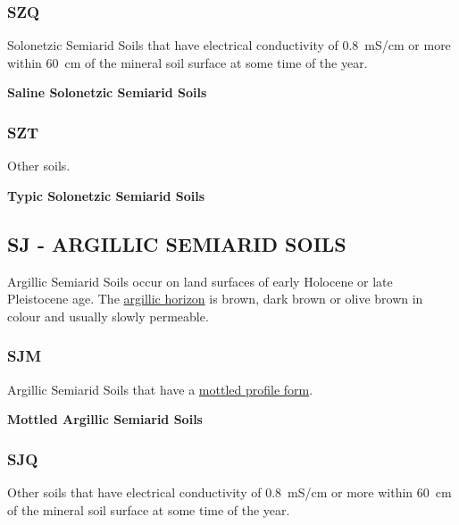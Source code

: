 \documentclass[
  letterpaper,
  DIV=11,
  numbers=noendperiod]{scrreprt}
\begin{document}
\hypertarget{sec-key-SZQ}{%
\subsubsection{\texorpdfstring{\textbf{SZQ}}{SZQ}}\label{sec-key-SZQ}}

Solonetzic Semiarid Soils that have electrical conductivity of 0.8~mS/cm
or more within 60~cm of the mineral soil surface at some time of the
year.

\textbf{Saline Solonetzic Semiarid Soils}

\hypertarget{sec-key-SZT}{%
\subsubsection{\texorpdfstring{\textbf{SZT}}{SZT}}\label{sec-key-SZT}}

Other soils.

\textbf{Typic Solonetzic Semiarid Soils}

\hypertarget{sec-SJ}{%
\subsection{\texorpdfstring{\textbf{SJ} - ARGILLIC SEMIARID
SOILS}{SJ - ARGILLIC SEMIARID SOILS}}\label{sec-SJ}}

Argillic Semiarid Soils occur on land surfaces of early Holocene or late
Pleistocene age. The \protect\hyperlink{sec-diag-argh}{argillic horizon}
is brown, dark brown or olive brown in colour and usually slowly
permeable.

\hypertarget{sec-key-SJM}{%
\subsubsection{\texorpdfstring{\textbf{SJM}}{SJM}}\label{sec-key-SJM}}

Argillic Semiarid Soils that have a
\protect\hyperlink{sec-diag-mottpf}{mottled profile form}.

\textbf{Mottled Argillic Semiarid Soils}

\hypertarget{sec-key-SJQ}{%
\subsubsection{\texorpdfstring{\textbf{SJQ}}{SJQ}}\label{sec-key-SJQ}}

Other soils that have electrical conductivity of 0.8~mS/cm or more
within 60~cm of the mineral soil surface at some time of the year.
\end{document}

